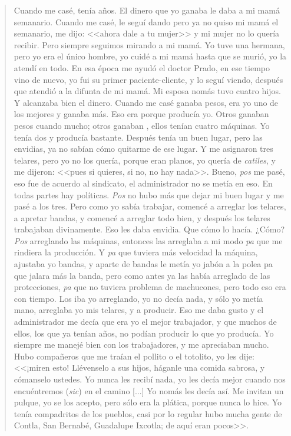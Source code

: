 \documentclass[14pt,letterpaper,twoside]{extbook} %
\begin{document}
\begin{quotation}
\noindent Cuando me casé, tenía  años. El dinero que yo ganaba le daba a mi mamá semanario. Cuando me casé, le seguí dando pero ya no quiso mi mamá el semanario, me dijo: <<ahora dale a tu mujer>> y mi mujer no lo quería recibir. Pero siempre seguimos mirando a mi mamá. Yo tuve una hermana, pero yo era el único hombre, yo cuidé a mi mamá hasta que se murió, yo la atendí en todo. En esa época me ayudó el doctor Prado, en ese tiempo vino de nuevo, yo fui su primer paciente-cliente, y lo seguí viendo, después que atendió a la difunta de mi mamá. Mi esposa nomás tuvo cuatro hijos. Y alcanzaba bien el dinero. Cuando me casé ganaba  pesos, era yo uno de los mejores y ganaba más. Eso era porque producía yo. Otros ganaban  pesos cuando mucho; otros ganaban , ellos tenían cuatro máquinas. Yo tenía dos y producía bastante. Después tenía un buen lugar, pero las envidias, ya no sabían cómo quitarme de ese lugar. Y me asignaron tres telares, pero yo no los quería, porque eran planos, yo quería de \textit{catiles}, y me dijeron: <<pues si quieres, si no, no hay nada>>. Bueno, \textit{pos} me pasé, eso fue de acuerdo al sindicato, el administrador no se metía en eso. En todas partes hay políticas. \textit{Pos} no hubo más que dejar mi buen lugar y me pasé a los tres. Pero como yo sabía trabajar, comencé a arreglar los telares, a apretar bandas, y comencé a arreglar todo bien, y después los telares trabajaban divinamente. Eso les daba envidia. Que cómo lo hacía. ¿Cómo? \textit{Pos} arreglando las máquinas, entonces las arreglaba a mi modo \textit{pa} que me rindiera la producción. Y \textit{pa} que tuviera más velocidad la máquina, ajustaba yo bandas, y aparte de bandas le metía yo jabón a la polea pa que jalara más la banda, pero como antes ya las había arreglado de las protecciones, \textit{pa} que no tuviera problema de machucones, pero todo eso era con tiempo. Los iba yo arreglando, yo no decía nada, y sólo yo metía mano, arreglaba yo mis telares, y a producir. Eso me daba gusto y el administrador me decía que era yo el mejor trabajador, y que muchos de ellos, los que ya tenían años, no podían producir lo que yo producía. Yo siempre me manejé bien con los trabajadores, y me apreciaban mucho. Hubo compañeros que me traían el pollito o el totolito, yo les dije: <<¡miren esto! Llévenselo a sus hijos, háganle una comida sabrosa, y cómanselo ustedes. Yo nunca les recibí nada, yo les decía mejor cuando nos encuéntremos (\textit{sic}) en el camino [...] Yo nomás les decía así. Me invitan un pulque, yo se los acepto, pero sólo era la plática, porque nunca lo hice. Yo tenía compadritos de los pueblos, casi por lo regular hubo mucha gente de Contla, San Bernabé, Guadalupe Ixcotla; de aquí eran pocos>>.
\end{quotation}
\end{document}
